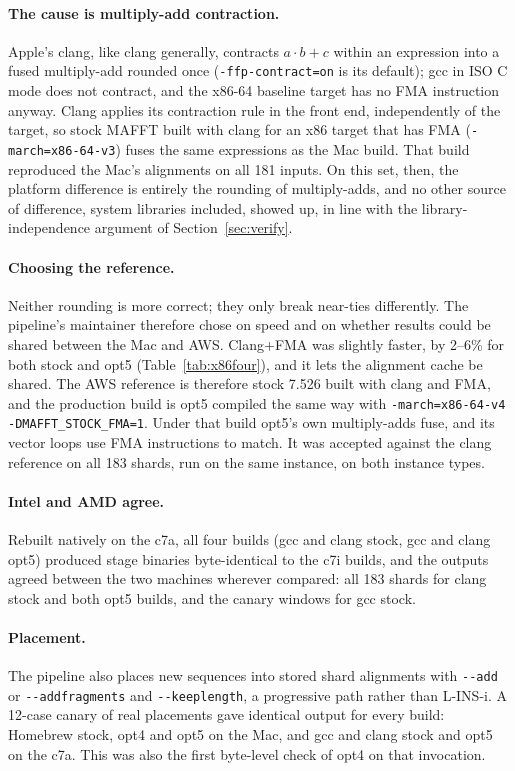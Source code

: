 \documentclass[11pt]{article}
\newcommand{\code}[1]{\texttt{#1}}
\begin{document}
\paragraph{The cause is multiply-add contraction.} Apple's clang, like clang generally,
contracts $a\cdot b + c$ within an expression into a fused multiply-add rounded once
(\code{-ffp-contract=on} is its default); gcc in ISO C mode does not contract, and the x86-64
baseline target has no FMA instruction anyway. Clang applies its contraction rule in the front
end, independently of the target, so stock MAFFT built with clang for an x86 target that has
FMA (\code{-march=x86-64-v3}) fuses the same expressions as the Mac build. That build
reproduced the Mac's alignments on all 181 inputs. On this set, then, the platform difference
is entirely the rounding of multiply-adds, and no other source of difference, system
libraries included, showed up, in line with the library-independence argument of
Section~\ref{sec:verify}.

\paragraph{Choosing the reference.} Neither rounding is more correct; they only break
near-ties differently. The pipeline's maintainer therefore chose on speed and on whether
results could be shared between the Mac and AWS. Clang+FMA was slightly faster, by 2--6\%
for both stock and opt5 (Table~\ref{tab:x86four}), and it lets the alignment cache be shared.
The AWS reference is therefore stock 7.526 built with clang and FMA, and the production build is
opt5 compiled the same way with \code{-march=x86-64-v4 -DMAFFT\_STOCK\_FMA=1}. Under that
build opt5's own multiply-adds fuse, and its vector loops use FMA instructions to match. It
was accepted against the clang reference on all 183 shards, run on the same instance, on
both instance types.

\paragraph{Intel and AMD agree.} Rebuilt natively on the c7a, all four builds (gcc and clang
stock, gcc and clang opt5) produced stage binaries byte-identical to the c7i builds, and the
outputs agreed between the two machines wherever compared: all 183 shards for clang stock and
both opt5 builds, and the canary windows for gcc stock.

\paragraph{Placement.} The pipeline also places new sequences into stored shard
alignments with \code{-{}-add} or \code{-{}-addfragments} and \code{-{}-keeplength}, a
progressive path rather than L-INS-i. A 12-case canary of real placements gave identical
output for every build: Homebrew stock, opt4 and opt5 on the Mac, and gcc and clang stock and
opt5 on the c7a. This was also the first byte-level check of opt4 on that invocation.
\end{document}
